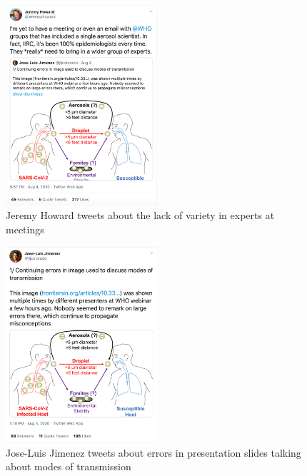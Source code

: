 \documentclass[acmsmall,authordraft]{acmart}
\begin{document}
\begin{figure}
  \includegraphics[width=0.5\textwidth]{Pictures/Appendix_Tweets/jeremy howard tweet.png}
  \caption{Jeremy Howard tweets about the lack of variety in experts at meetings}
  \label{jeremy_howard_tweet}
\end{figure}

\begin{figure}
  \includegraphics[width=0.5\textwidth]{Pictures/Appendix_Tweets/jose-luis jimenez tweet.png}
  \caption{Jose-Luis Jimenez tweets about errors in presentation slides talking about modes of transmission}
  \label{jose_luis_jimenez_tweet}
\end{figure}
\end{document}
